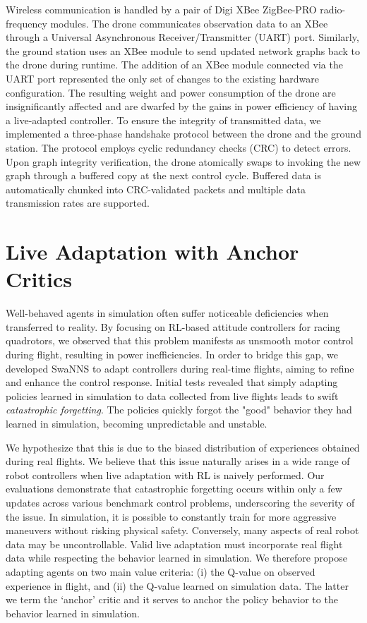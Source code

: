 \documentclass[letterpaper, 10 pt, conference]{ieeeconf} %
\newcommand{\framework}{SwaNNS}
\begin{document}
    Wireless communication is handled by a pair of Digi XBee\textsuperscript{\circledR} ZigBee\textsuperscript{\circledR}-PRO  radio-frequency modules. 
    The drone communicates observation data to an XBee through a Universal Asynchronous Receiver/Transmitter (UART) port.
    Similarly, the ground station uses an XBee module to send updated network graphs back to the drone during runtime.
    The addition of an XBee module connected via the UART port represented the only set of changes to the existing hardware configuration.
    The resulting weight and power consumption of the drone are insignificantly affected and are dwarfed by the gains in power efficiency of having a live-adapted controller. 
    To ensure the integrity of transmitted data, we implemented a three-phase handshake protocol between the drone and the ground station. The protocol employs cyclic redundancy checks (CRC) to detect errors.
    Upon graph integrity verification, the drone atomically swaps to invoking the new graph through a buffered copy at the next control cycle.
    Buffered data is automatically chunked into CRC-validated packets and multiple data transmission rates are supported.

\section{Live Adaptation with Anchor Critics}\label{subsec:anchor_crit}
    Well-behaved agents in simulation often suffer noticeable deficiencies when transferred to reality.
    By focusing on RL-based attitude controllers for racing quadrotors, we observed that this problem manifests as unsmooth motor control during flight, resulting in power inefficiencies.
    In order to bridge this gap, we developed \framework{} to adapt controllers during real-time flights, aiming to refine and enhance the control response.
    Initial tests revealed that simply adapting policies learned in simulation to data collected from live flights leads to swift \emph{catastrophic forgetting}.
    The policies quickly forgot the "good" behavior they had learned in simulation, becoming unpredictable and unstable.
    
    We hypothesize that this is due to the biased distribution of experiences obtained during real flights.
    We believe that this issue naturally arises in a wide range of robot controllers when live adaptation with RL is naively performed.
    Our evaluations demonstrate that catastrophic forgetting occurs within only a few updates across various benchmark control problems, underscoring the severity of the issue.
    In simulation, it is possible to constantly train for more aggressive maneuvers without risking physical safety. 
    Conversely, many aspects of real robot data may be uncontrollable.
    Valid live adaptation must incorporate real flight data while respecting the behavior learned in simulation.
    We therefore propose adapting agents on two main value criteria: (i) the Q-value on observed experience in flight, and (ii) the Q-value learned on simulation data.
    The latter we term the `anchor' critic and it serves to anchor the policy behavior to the behavior learned in simulation.
     
\end{document}
